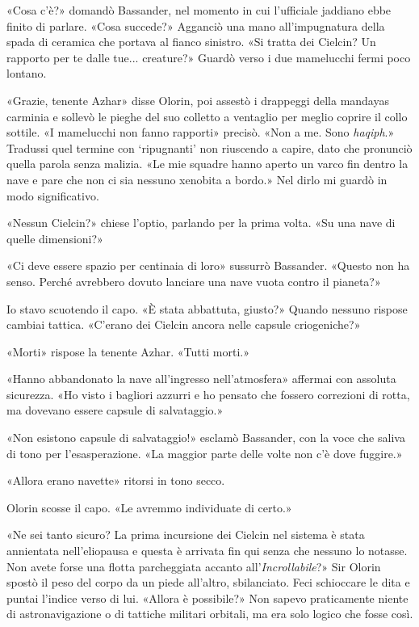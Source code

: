 «Cosa c'è?» domandò Bassander, nel momento in cui l'ufficiale jaddiano
ebbe finito di parlare. «Cosa succede?» Agganciò una mano
all'impugnatura della spada di ceramica che portava al fianco sinistro.
«Si tratta dei Cielcin? Un rapporto per te dalle tue... creature?»
Guardò verso i due mamelucchi fermi poco lontano.

«Grazie, tenente Azhar» disse Olorin, poi assestò i drappeggi della
mandayas carminia e sollevò le pieghe del suo colletto a ventaglio per
meglio coprire il collo sottile. «I mamelucchi non fanno rapporti»
precisò. «Non a me. Sono \emph{haqiph}.» Tradussi quel termine con
`ripugnanti' non riuscendo a capire, dato che pronunciò quella parola
senza malizia. «Le mie squadre hanno aperto un varco fin dentro la nave
e pare che non ci sia nessuno xenobita a bordo.» Nel dirlo mi guardò in
modo significativo.

«Nessun Cielcin?» chiese l'optio, parlando per la prima volta. «Su una
nave di quelle dimensioni?»

«Ci deve essere spazio per centinaia di loro» sussurrò Bassander.
«Questo non ha senso. Perché avrebbero dovuto lanciare una nave vuota
contro il pianeta?»

Io stavo scuotendo il capo. «È stata abbattuta, giusto?» Quando nessuno
rispose cambiai tattica. «C'erano dei Cielcin ancora nelle capsule
criogeniche?»

«Morti» rispose la tenente Azhar. «Tutti morti.»

«Hanno abbandonato la nave all'ingresso nell'atmosfera» affermai con
assoluta sicurezza. «Ho visto i bagliori azzurri e ho pensato che
fossero correzioni di rotta, ma dovevano essere capsule di salvataggio.»

«Non esistono capsule di salvataggio!» esclamò Bassander, con la voce
che saliva di tono per l'esasperazione. «La maggior parte delle volte
non c'è dove fuggire.»

«Allora erano navette» ritorsi in tono secco.

Olorin scosse il capo. «Le avremmo individuate di certo.»

«Ne sei tanto sicuro? La prima incursione dei Cielcin nel sistema è
stata annientata nell'eliopausa e questa è arrivata fin qui senza che
nessuno lo notasse. Non avete forse una flotta parcheggiata accanto
all'\emph{Incrollabile}?» Sir Olorin spostò il peso del corpo da un
piede all'altro, sbilanciato. Feci schioccare le dita e puntai l'indice
verso di lui. «Allora è possibile?» Non sapevo praticamente niente di
astronavigazione o di tattiche militari orbitali, ma era solo logico che
fosse così.

